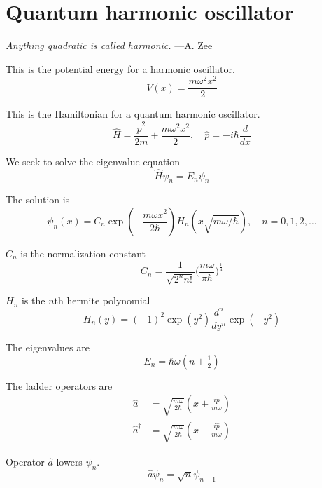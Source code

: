 

\section*{Quantum harmonic oscillator}

{\it Anything quadratic is called harmonic.} ---A. Zee

\bigskip
This is the potential energy for a harmonic oscillator.
\begin{equation*}
V(x)=\frac{m\omega^2 x^2}{2}
\end{equation*}

This is the Hamiltonian for a quantum harmonic oscillator.
\begin{equation*}
\hat H=\frac{\hat p^2}{2m}+\frac{m\omega^2 x^2}{2},\quad\hat p=-i\hbar\frac{d}{dx}
\end{equation*}

We seek to solve the eigenvalue equation
\begin{equation*}
\hat H\psi_n=E_n\psi_n
\end{equation*}

The solution is
\begin{equation*}
\psi_n(x)=C_n\exp\left(-\frac{m\omega x^2}{2\hbar}\right)
H_n\left(x\sqrt{m\omega/\hbar}\right),\quad n=0,1,2,\ldots
\end{equation*}

$C_n$ is the normalization constant
\begin{equation*}
C_n=\frac{1}{\sqrt{2^nn!}}\biggl(\frac{m\omega}{\pi\hbar}\biggr)^{\frac{1}{4}}
\end{equation*}

$H_n$ is the $n$th hermite polynomial
\begin{equation*}
H_n(y)=(-1)^2\exp\left(y^2\right)\frac{d^n}{dy^n}\exp\left(-y^2\right)
\end{equation*}

The eigenvalues are
\begin{equation*}
E_n=\hbar\omega\left(n+\tfrac{1}{2}\right)
\end{equation*}

The ladder operators are
\begin{align*}
\hat a&=\sqrt{\frac{m\omega}{2\hbar}}\left(x+\frac{i\hat p}{m\omega}\right)
\\[1ex]
\hat a^\dag&=\sqrt{\frac{m\omega}{2\hbar}}\left(x-\frac{i\hat p}{m\omega}\right)
\end{align*}

Operator $\hat a$ lowers $\psi_n$.
\begin{equation*}
\hat a\psi_n=\sqrt n\psi_{n-1}
\end{equation*}

